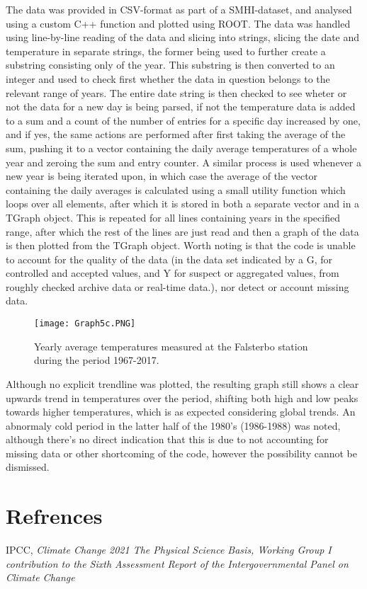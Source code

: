 \documentclass{article}
\begin{document}
The data was provided in CSV-format as part of a SMHI-dataset, and analysed using a custom C++ function and plotted using ROOT. The data was handled using line-by-line reading of the data and slicing into strings, slicing the date and temperature in separate strings, the former being used to further create a substring consisting only of the year. This substring is then converted to an integer and used to check first whether the data in question belongs to the relevant range of years. The entire date string is then checked to see wheter or not the data for a new day is being parsed, if not the temperature data is added to a sum and a count of the number of entries for a specific day increased by one, and if yes, the same actions are performed after first taking the average of the sum, pushing it to a vector containing the daily average temperatures of a whole year and zeroing the sum and entry counter. A similar process is used whenever a new year is being iterated upon, in which case the average of the vector containing the daily averages is calculated using a small utility function which loops over all elements, after which it is stored in both a separate vector and in a TGraph object. This is repeated for all lines containing years in the specified range, after which the rest of the lines are just read and then a graph of the data is then plotted from the TGraph object. Worth noting is that the code is unable to account for the quality of the data (in the data set indicated by a G, for controlled and accepted values, and Y for suspect or aggregated values, from roughly checked archive data or real-time data.), nor detect or account missing data.

\begin{figure}[H]
    \centering
    \texttt{[image: Graph5c.PNG]}
    \caption{Yearly average temperatures measured at the Falsterbo station during the period 1967-2017.}
    \label{dipole}
\end{figure}

Although no explicit trendline was plotted, the resulting graph still shows a clear upwards trend in temperatures over the period, shifting both high and low peaks towards higher temperatures, which is as expected considering global trends. An abnormaly cold period in the latter half of the 1980's (1986-1988) was noted, although there's no direct indication that this is due to not accounting for missing data or other shortcoming of the code, however the possibility cannot be dismissed.


\section{Refrences}
\begin{thebibliography}{}

 IPCC, \textit{Climate Change 2021 The Physical Science Basis, Working Group I contribution to the Sixth Assessment Report of the Intergovernmental Panel on Climate Change}

\end{thebibliography}


\end{document}
